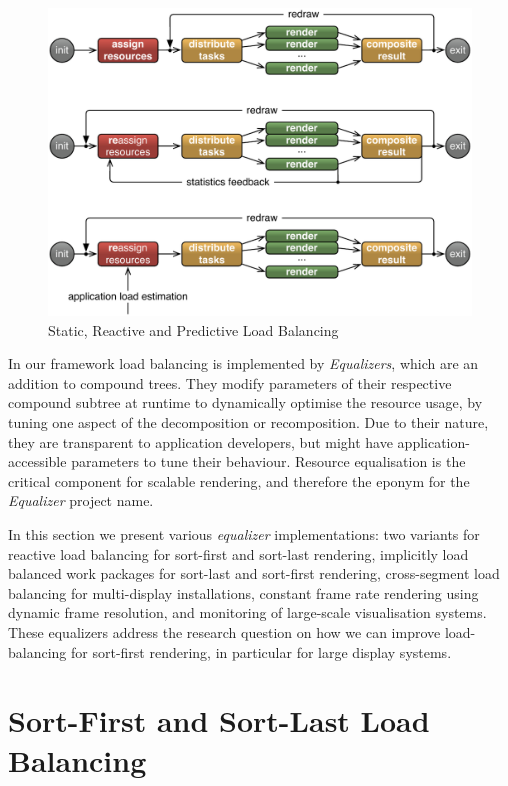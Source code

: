 \begin{figure}[h!t]
  \includegraphics[width=\textwidth]{images/loadBalancing}
  \caption{\label{floadbalancing}Static, Reactive and Predictive Load Balancing}
\end{figure}

In our framework load balancing is implemented by {\em Equalizers}, which are
an addition to compound trees. They modify parameters of their respective
compound subtree at runtime to dynamically optimise the resource usage, by
tuning one aspect of the decomposition or recomposition. Due to their nature,
they are transparent to application developers, but might have
application-accessible parameters to tune their behaviour. Resource
equalisation is the critical component for scalable rendering, and therefore
the eponym for the {\em Equalizer} project name.

In this section we present various {\em equalizer} implementations: two
variants for reactive load balancing for sort-first and sort-last rendering,
implicitly load balanced work packages for sort-last and sort-first rendering,
cross-segment load balancing for multi-display installations, constant frame
rate rendering using dynamic frame resolution, and monitoring of large-scale
visualisation systems. These equalizers address the research question on how we
can improve load-balancing for sort-first rendering, in particular for large
display systems.

\section{Sort-First and Sort-Last Load Balancing}\label{sLoadEqualizer}

